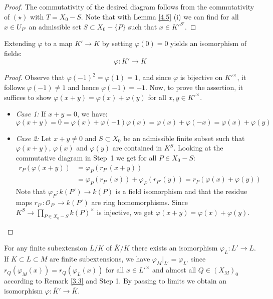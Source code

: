 \begin{proof}
The commutativity of the desired diagram follows from the commutativity of $(\star)$ with $T=X_0 -  S$. Note that with Lemma \ref{4.5} (i) we can find for all $x\in U_{P'}$ an admissible set $S\subset X_0 -  \{P\}$ such that $x\in K'^{S'}$.
\end{proof}

\begin{step}
Extending $\varphi$ to a map $K'\to K$ by setting $\varphi(0)=0$ yields an isomorphism of fields: 
\[\varphi:K'\to K\]
\end{step}

\begin{proof}
Observe that $\varphi(-1)^2 = \varphi(1) = 1$, and since $\varphi$ is bijective on $K'^\times$, it follows $\varphi(-1) \neq 1$ and hence $\varphi(-1) = -1$. Now, to prove the assertion, it suffices to show $\varphi(x + y) = \varphi(x) + \varphi(y)$ for all $x,y\in K'^\times$.
\begin{itemize}
\item \textit{Case 1:} If $x + y = 0$, we have:
\[ \varphi(x + y) = 0 = \varphi(x) + \varphi(-1)\varphi(x) = \varphi(x) + \varphi(-x) = \varphi(x) + \varphi(y) \]
\item \textit{Case 2:} Let $x + y\neq 0$ and $S\subset X_0$ be an admissible finite subset such that $\varphi(x + y)$, $\varphi(x)$ and $\varphi(y)$ are contained in $K^S$. Looking at the commutative diagram in \mbox{Step 1} we get for all $P\in X_0 -  S$:
\begin{align*}
r_P(\varphi(x+ y)) &= \varphi_P(r_{P'}(x + y)) \\
&= \varphi_P(r_{P'}(x)) + \varphi_P(r_{P'}(y)) = r_P(\varphi(x) + \varphi(y))
\end{align*}
Note that $\varphi_P: k(P')\to k(P)$ is a field isomorphism and that the residue maps $r_{P'}: \mathcal{O}_{P'} \to k(P')$ are ring homomorphisms. Since $K^S\to \prod_{P\in X_0 -  S} k(P)^\times$ is injective, we get $\varphi(x+y) = \varphi(x) + \varphi(y)$.\qedhere
\end{itemize}
\end{proof}

\begin{remark}
For any finite subextension $L/K$ of $\overline{K}/K$ there exists an isomorphism $\varphi_L: L'\to L$. If $K\subset L\subset M$ are finite subextensions, we have $\varphi_M|_{L'} = \varphi_{L'}$ since $r_Q(\varphi_M(x)) = r_Q(\varphi_L(x))$ for all $x\in L'^\times$ and almost all $Q\in (X_M)_0$ according to Remark \ref{3.3} and Step 1. By passing to limits we obtain an isomorphism $\varphi: \overline{K}'\to \overline{K}$.
\end{remark}

